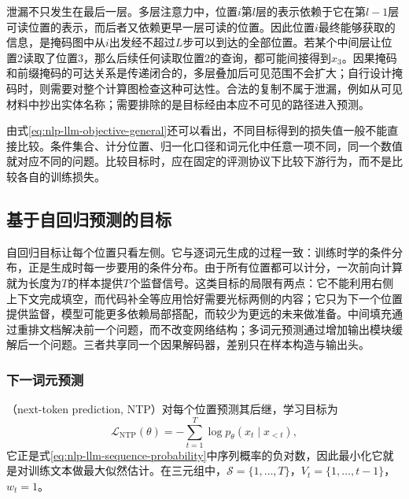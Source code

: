 泄漏不只发生在最后一层。多层注意力中，位置$i$第$l$层的表示依赖于它在第$l-1$层可读位置的表示，而后者又依赖更早一层可读的位置。因此位置$i$最终能够获取的信息，是掩码图中从$i$出发经不超过$L$步可以到达的全部位置。若某个中间层让位置2读取了位置3，那么后续任何读取位置2的查询，都可能间接得到$x_3$。因果掩码和前缀掩码的可达关系是传递闭合的，多层叠加后可见范围不会扩大；自行设计掩码时，则需要对整个计算图检查这种可达性。合法的复制不属于泄漏，例如从可见材料中抄出实体名称；需要排除的是目标经由本应不可见的路径进入预测。

由式\eqref{eq:nlp-llm-objective-general}还可以看出，不同目标得到的损失值一般不能直接比较。条件集合、计分位置、归一化口径和词元化中任意一项不同，同一个数值就对应不同的问题。比较目标时，应在固定的评测协议下比较下游行为，而不是比较各自的训练损失。

\subsection{基于自回归预测的目标}
\label{sec:nlp-llm-objective-autoregressive}

自回归目标让每个位置只看左侧。它与逐词元生成的过程一致：训练时学的条件分布，正是生成时每一步要用的条件分布。由于所有位置都可以计分，一次前向计算就为长度为$T$的样本提供$T$个监督信号。这类目标的局限有两点：它不能利用右侧上下文完成填空，而代码补全等应用恰好需要光标两侧的内容；它只为下一个位置提供监督，模型可能更多依赖局部搭配，而较少为更远的未来做准备。中间填充通过重排文档解决前一个问题，而不改变网络结构；多词元预测通过增加输出模块缓解后一个问题。三者共享同一个因果解码器，差别只在样本构造与输出头。

\subsubsection{下一词元预测}
\label{sec:nlp-llm-objective-positions}

（next-token prediction, NTP）对每个位置预测其后继，学习目标为
\begin{equation}
 \mathcal L_{\mathrm{NTP}}(\theta)=
 -\sum_{t=1}^{T}\log p_\theta(x_t\mid x_{<t}),
 \label{eq:nlp-llm-ntp}
\end{equation}
它正是式\eqref{eq:nlp-llm-sequence-probability}中序列概率的负对数，因此最小化它就是对训练文本做最大似然估计。在三元组中，$\mathcal S=\{1,\ldots,T\}$，$V_t=\{1,\ldots,t-1\}$，$w_t=1$。

